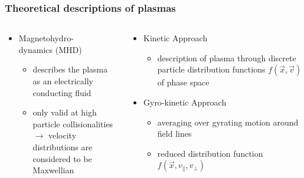 \documentclass{beamer}
\begin{document}
\begin{frame}
\frametitle{Theoretical descriptions of plasmas}
\vspace{-1.5 cm}
\begin{columns}[onlytextwidth]
	\begin{column}{0.5\textwidth}
		\begin{center}
			\begin{itemize}
			\item Magnetohydro-\\
			dynamics (MHD)
			\begin{itemize}
				\item describes the plasma as an electrically conducting fluid
				\item only valid at high particle collisionalities \\
				$\rightarrow$ velocity distributions are considered to be Maxwellian
			\end{itemize}
			\end{itemize}
		\end{center}
	\end{column}
	\begin{column}{0.5\textwidth}
		\begin{center}
			\begin{itemize}
			\item Kinetic Approach
				\begin{itemize}
						\item description of plasma through discrete particle distribution functions $f(\vec{x},\vec{v})$ of phase space
				\end{itemize}
			\item Gyro-kinetic Approach
				\begin{itemize}
				\item averaging over gyrating motion around field lines
				\item reduced distribution function $f(\vec{x},v_\parallel, v_\perp)$
			\end{itemize}
			\end{itemize}
		\end{center}
	\end{column}
\end{columns}
 \end{frame}
\end{document}
